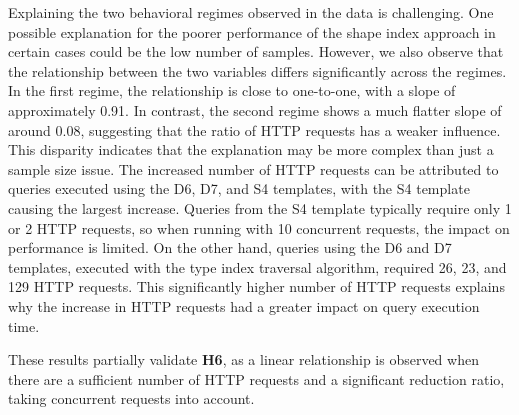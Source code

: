 Explaining the two behavioral regimes observed in the data is challenging.
One possible explanation for the poorer performance of the shape index approach in certain cases could be the low number of samples.
However, we also observe that the relationship between the two variables differs significantly across the regimes.
In the first regime, the relationship is close to one-to-one, with a slope of approximately 0.91.
In contrast, the second regime shows a much flatter slope of around 0.08, suggesting that the ratio of HTTP requests has a weaker influence.
This disparity indicates that the explanation may be more complex than just a sample size issue.
The increased number of HTTP requests can be attributed to queries executed using the D6, D7, and S4 templates, with the S4 template causing the largest increase.
Queries from the S4 template typically require only 1 or 2 HTTP requests, so when running with 10 concurrent requests, the impact on performance is limited.
On the other hand, queries using the D6 and D7 templates, executed with the type index traversal algorithm, required 26, 23, and 129 HTTP requests.
This significantly higher number of HTTP requests explains why the increase in HTTP requests had a greater impact on query execution time.

These results partially validate \textbf{H6}, as a linear relationship is observed when there are a sufficient number of HTTP requests and a significant reduction ratio, taking concurrent requests into account.